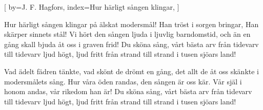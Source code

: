 

[
by={J. F. Hagfors},
index={Hur härligt sången klingar},
]

\beginverse*
Hur härligt sången klingar på älskat modersmål!
Han tröst i sorgen bringar, Han skärper sinnets stål!
Vi hört den sången ljuda i ljuvlig barndomstid,
och än en gång skall bjuda åt oss i graven frid!
Du sköna sång, vårt bästa arv från tidevarv till tidevarv
ljud högt, ljud fritt från strand till strand
i tusen sjöars land!
\endverse

\beginverse*
Vad ädelt fädren tänkte, vad skönt de drömt en gång,
det allt de åt oss skänkte i modersmålets sång.
Hur våra öden randas, den sången är oss kär.
Vår själ i honom andas, vår rikedom han är!
Du sköna sång, vårt bästa arv från tidevarv till tidevarv
ljud högt, ljud fritt från strand till strand
i tusen sjöars land! 
\endverse
\endsong



